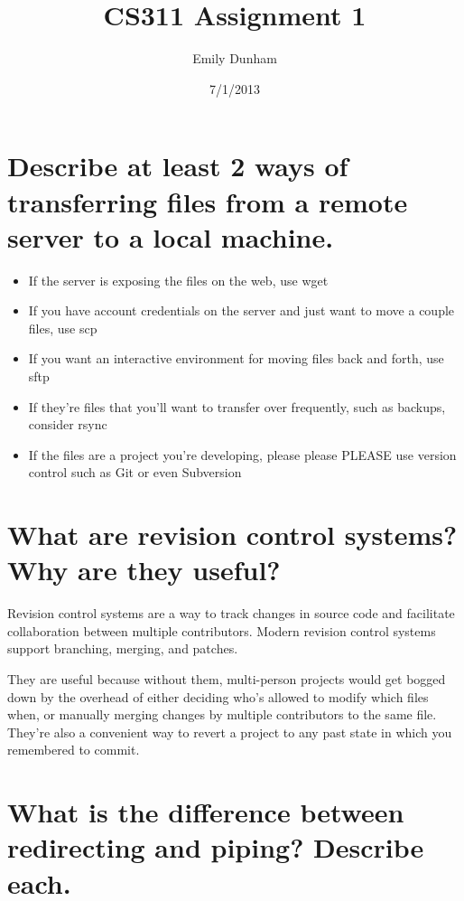 \documentclass[10pt]{article}
\title{CS311 Assignment 1}
\author{Emily Dunham}
\date{7/1/2013}
\begin{document}
\maketitle

\section{Describe at least 2 ways of transferring files from a remote
server to a local machine.} 

\begin{itemize}

\item If the server is exposing the files on the web, use wget

\item If you have account credentials on the server and just want to move a
couple files, use scp

\item If you want an interactive environment for moving files back and forth,
use sftp

\item If they're files that you'll want to transfer over frequently, such as
backups, consider rsync

\item If the files are a project you're developing, please please PLEASE use
version control such as Git or even Subversion

\end{itemize}

\section{What are revision control systems? Why are they useful?}

Revision control systems are a way to track changes in source code and
facilitate collaboration between multiple contributors. Modern revision
control systems support branching, merging, and patches. 

They are useful because without them, multi-person projects would get bogged
down by the overhead of either deciding who's allowed to modify which files
when, or manually merging changes by multiple contributors to the same file.
They're also a convenient way to revert a project to any past state in which
you remembered to commit.

\section{What is the difference between redirecting and piping? Describe each.}
\end{document}
